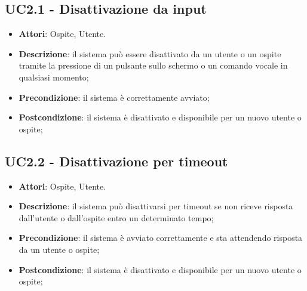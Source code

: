 \documentclass[../AnalisiDeiRequisiti.tex]{subfiles}
\begin{document}
\subsection{UC2.1 - Disattivazione da input} 
\label{sssec:UC2.1} 
\begin{itemize} 
\item \textbf{Attori}: Ospite, Utente.
\item \textbf{Descrizione}: il sistema può essere disattivato da un utente o un ospite tramite la pressione di un pulsante sullo schermo o un comando vocale in qualsiasi momento;
\item \textbf{Precondizione}: il sistema è correttamente avviato;
\item \textbf{Postcondizione}: il sistema è disattivato e disponibile per un nuovo utente o ospite;
\end{itemize} 
\subsection{UC2.2 - Disattivazione per timeout} 
\label{sssec:UC2.2} 
\begin{itemize} 
\item \textbf{Attori}: Ospite, Utente.
\item \textbf{Descrizione}: il sistema può disattivarsi per timeout se non riceve risposta dall'utente o dall'ospite entro un  determinato tempo;
\item \textbf{Precondizione}: il sistema è avviato correttamente e sta attendendo risposta da un utente o ospite;
\item \textbf{Postcondizione}: il sistema è disattivato e disponibile per un nuovo utente o ospite;
\end{itemize} 
\end{document}
